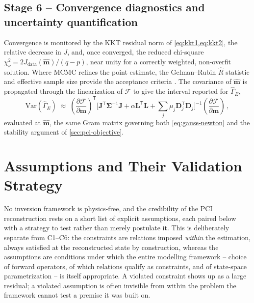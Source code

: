 \subsection{Stage 6 -- Convergence diagnostics and uncertainty quantification}

Convergence is monitored by the KKT residual norm of \cref{eq:kkt1,eq:kkt2}, the relative decrease in $J$, and, once converged, the reduced chi-square $\chi^{2}_{\nu}=2J_{\mathrm{data}}(\hat{\mathbf m})/(q-p)$, near unity for a correctly weighted, non-overfit solution. Where MCMC refines the point estimate, the Gelman--Rubin $\hat R$ statistic and effective sample size provide the acceptance criteria \cite{ref0709,ref0710,ref0727}. The covariance of $\hat{\mathbf m}$ is propagated through the linearization of $\mathcal F$ to give the interval reported for $\hat\Gamma_{E}$,
\begin{equation}
\mathrm{Var}(\hat\Gamma_{E}) \;\approx\; \left(\frac{\partial \mathcal F}{\partial \mathbf m}\right)^{\!\mathsf T}\!\Big[\mathbf J^{\mathsf T}\boldsymbol\Sigma^{-1}\mathbf J + \alpha\mathbf L^{\mathsf T}\mathbf L + \textstyle\sum_{j}\mu_{j}\mathbf D_{j}^{\mathsf T}\mathbf D_{j}\Big]^{-1}\left(\frac{\partial \mathcal F}{\partial \mathbf m}\right) \, , \label{eq:gammaE-variance}
\end{equation}
evaluated at $\hat{\mathbf m}$, the same Gram matrix governing both \cref{eq:gauss-newton} and the stability argument of \cref{sec:pci-objective}.

\section{Assumptions and Their Validation Strategy}
\label{sec:pci-assumptions}

No inversion framework is physics-free, and the credibility of the PCI reconstruction rests on a short list of explicit assumptions, each paired below with a strategy to test rather than merely postulate it. This is deliberately separate from C1--C6: the constraints are relations imposed \emph{within} the estimation, always satisfied at the reconstructed state by construction, whereas the assumptions are conditions under which the entire modelling framework -- choice of forward operators, of which relations qualify as constraints, and of state-space parametrization -- is itself appropriate. A violated constraint shows up as a large residual; a violated assumption is often invisible from within the problem the framework cannot test a premise it was built on.

